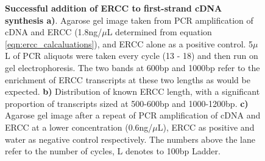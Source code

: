 \begin{figure}[!htp]
\begin{center}
	\end{center}
	\captionsetup{width=0.95\textwidth}
	\caption[ERCC usage to benchmark library preparation and sequencing performance runs]%
	{\textbf{Successful addition of ERCC to first-strand cDNA synthesis a)}. Agarose gel image taken from PCR amplification of cDNA and ERCC (1.8ng/$\mu$L determined from equation \ref{eqn:ercc_calcaluations}), and ERCC alone as a positive control. 5$\mu$L of PCR aliquots were taken every cycle (13 - 18) and then run on gel electrophoresis. The two bands at 600bp and 1000bp refer to the enrichment of ERCC transcripts at these two lengths as would be expected. \textbf{b)} Distribution of known ERCC length, with a significant proportion of transcripts sized at 500-600bp and 1000-1200bp. \textbf{c)} Agarose gel image after a repeat of PCR amplification of cDNA and ERCC at a lower concentration (0.6ng/$\mu$L), ERCC as positive and water as negative control respectively. The numbers above the lane refer to the number of cycles, L denotes to 100bp Ladder.}
	\label{fig:ercc_lab_gel}
\end{figure}
 
